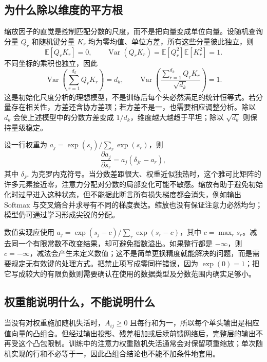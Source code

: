 \documentclass[UTF8,12pt,a4paper,fontset=fandol]{ctexart}
\begin{document}
\subsection{为什么除以维度的平方根}

缩放因子的直觉是控制匹配分数的尺度，而不是把向量变成单位向量。设随机查询分量 $Q_r$ 和随机键分量 $K_r$ 均为零均值、单位方差，所有这些分量彼此独立，则
\[
\mathbb E[Q_rK_r]=0,\qquad
\operatorname{Var}(Q_rK_r)=\mathbb E[Q_r^2]\mathbb E[K_r^2]=1.
\]
不同坐标的乘积也独立，因此
\begin{equation}
\operatorname{Var}\left(\sum_{r=1}^{d_k}Q_rK_r\right)=d_k,
\qquad
\operatorname{Var}\left(\frac{\sum_{r=1}^{d_k}Q_rK_r}{\sqrt{d_k}}\right)=1.
\label{eq:tr-scale}
\end{equation}
这是初始化尺度分析的理想模型，不是训练后每个头必然满足的统计恒等式。若分量存在相关性，方差还含协方差项；若方差不是一，也需要相应调整分析。除以 $d_k$ 会使上述模型中的分数方差变成 $1/d_k$，维度越大越趋于平坦；除以 $\sqrt{d_k}$ 则保持量级稳定。

设一行权重为 $a_j=\exp(s_j)/\sum_r\exp(s_r)$，则
\begin{equation}
\frac{\partial a_j}{\partial s_r}=a_j(\delta_{jr}-a_r),
\label{eq:tr-softmax-grad}
\end{equation}
其中 $\delta_{jr}$ 为克罗内克符号。当分数差距很大、权重近似独热时，这个雅可比矩阵的许多元素接近零，注意力分配对分数的局部变化可能不敏感。缩放有助于避免初始化时过早进入这种状态，但不能据此断言所有损失梯度都会消失，例如输出 Softmax 与交叉熵合并求导有不同的梯度表达。缩放也没有保证注意力必然均匀；模型仍可通过学习形成尖锐的分配。

数值实现应使用 $a_j=\exp(s_j-c)/\sum_r\exp(s_r-c)$，其中 $c=\max_r s_r$。减去同一个有限常数不改变结果，却可避免指数溢出。如果整行都是 $-\infty$，则 $c=-\infty$，减法会产生未定义数值；这不是简单更换精度就能解决的问题，而是需要规定无有效键的处理方式。把禁止项写成零同样错误，因为 $\exp(0)=1$；把它写成较大的有限负数则需要确认在使用的数据类型及分数范围内确实足够小。

\subsection{权重能说明什么，不能说明什么}

当没有对权重施加随机失活时，$A_{ij}\geq0$ 且每行和为一，所以每个单头输出是相应值向量的凸组合。但经过输出投影、残差相加或后续前馈网络后，完整层的输出不再受这个凸包限制。训练中的注意力权重随机失活通常会对保留项重缩放；单次随机实现的行和不必等于一，因此凸组合结论也不能不加条件地套用。
\end{document}
